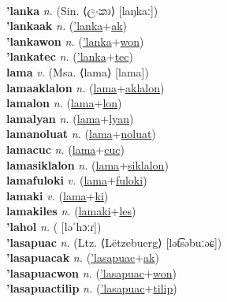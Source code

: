  \label{lanaukiles} \\
\textbf{'lanka} \textit{n.} (Sin. ⟨ලංකා⟩ [laŋkaː])
 \label{'lanka} \\
\textbf{'lankaak} \textit{n.} (\hyperref['lanka]{'lanka}+\hyperref[ak]{ak})
 \label{'lankaak} \\
\textbf{'lankawon} \textit{n.} (\hyperref['lanka]{'lanka}+\hyperref[won]{won})
 \label{'lankawon} \\
\textbf{'lankatec} \textit{n.} (\hyperref['lanka]{'lanka}+\hyperref[tec]{tec})
 \label{'lankatec} \\
\textbf{lama} \textit{v.} (Msa. ⟨lama⟩ [lama])
 \label{lama} \\
\textbf{lamaaklalon} \textit{n.} (\hyperref[lama]{lama}+\hyperref[aklalon]{aklalon})
 \label{lamaaklalon} \\
\textbf{lamalon} \textit{n.} (\hyperref[lama]{lama}+\hyperref[lon]{lon})
 \label{lamalon} \\
\textbf{lamalyan} \textit{n.} (\hyperref[lama]{lama}+\hyperref[lyan]{lyan})
 \label{lamalyan} \\
\textbf{lamanoluat} \textit{n.} (\hyperref[lama]{lama}+\hyperref[noluat]{noluat})
 \label{lamanoluat} \\
\textbf{lamacuc} \textit{n.} (\hyperref[lama]{lama}+\hyperref[cuc]{cuc})
 \label{lamacuc} \\
\textbf{lamasiklalon} \textit{n.} (\hyperref[lama]{lama}+\hyperref[siklalon]{siklalon})
 \label{lamasiklalon} \\
\textbf{lamafuloki} \textit{v.} (\hyperref[lama]{lama}+\hyperref[fuloki]{fuloki})
 \label{lamafuloki} \\
\textbf{lamaki} \textit{v.} (\hyperref[lama]{lama}+\hyperref[ki]{ki})
 \label{lamaki} \\
\textbf{lamakiles} \textit{n.} (\hyperref[lamaki]{lamaki}+\hyperref[les]{les})
 \label{lamakiles} \\
\textbf{'lahol} \textit{n.} ( [ləˈhɔːɾ])
 \label{'lahol} \\
\textbf{'lasapuac} \textit{n.} (Ltz. ⟨Lëtzebuerg⟩ [lət͡səbuːəɕ])
 \label{'lasapuac} \\
\textbf{'lasapuacak} \textit{n.} (\hyperref['lasapuac]{'lasapuac}+\hyperref[ak]{ak})
 \label{'lasapuacak} \\
\textbf{'lasapuacwon} \textit{n.} (\hyperref['lasapuac]{'lasapuac}+\hyperref[won]{won})
 \label{'lasapuacwon} \\
\textbf{'lasapuactilip} \textit{n.} (\hyperref['lasapuac]{'lasapuac}+\hyperref[tilip]{tilip})
 \label{'lasapuactilip} \\
